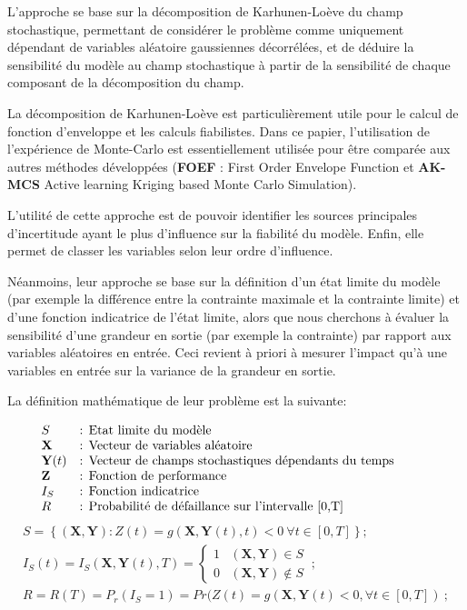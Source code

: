 \documentclass[a4paper,10pt]{article}
\begin{document}
L'approche se base sur la décomposition de Karhunen-Loève du champ stochastique, permettant de considérer le problème comme uniquement dépendant de variables aléatoire gaussiennes décorrélées, et de déduire la sensibilité du modèle au champ stochastique à partir de la sensibilité de chaque composant de la décomposition du champ. \smallskip 

La décomposition de Karhunen-Loève est particulièrement utile pour le calcul de fonction d'enveloppe et les calculs fiabilistes. Dans ce papier, l'utilisation de l’expérience de Monte-Carlo est essentiellement utilisée pour être comparée aux autres méthodes développées (\textbf{FOEF} : First Order Envelope Function et \textbf{AK-MCS} Active learning Kriging based Monte Carlo Simulation). \smallskip

L'utilité de cette approche est de pouvoir identifier les sources principales d'incertitude ayant le plus d'influence sur la fiabilité du modèle. Enfin, elle permet de classer les variables selon leur ordre d'influence. \smallskip

Néanmoins, leur approche se base sur la définition d'un état limite du modèle (par exemple la différence entre la contrainte maximale et la contrainte limite) et d'une fonction indicatrice de l'état limite, alors que nous cherchons à évaluer la sensibilité d'une grandeur en sortie (par exemple la contrainte) par rapport aux variables aléatoires en entrée. Ceci revient à priori à mesurer l'impact qu'à une variables en entrée sur la variance de la grandeur en sortie. \smallskip

La définition mathématique de leur problème est la suivante: 

   \[
      \begin{array}{lp{0.8\linewidth}}
         S             & : Etat limite du modèle \\
         \textbf{X}    & : Vecteur de variables aléatoire \\
         \textbf{Y}(t) & : Vecteur de champs stochastiques dépendants du temps \\
         \textbf{Z}    & : Fonction de performance \\
         I_S 	       & : Fonction indicatrice \\
         R  		   & : Probabilité de défaillance sur l'intervalle [0,T]
      \end{array}
   \]
   \begin{eqnarray}   
S = \left\lbrace \left( \textbf{X},\textbf{Y}\right) :Z(t)=g\left(\textbf{X},\textbf{Y}(t),t\right)<0\ \forall t \in\left[0,T \right] \right\rbrace ;\\
I_S(t) = I_S(\textbf{X},\textbf{Y}(t),T) = 
\begin{cases}
	1 &  (\textbf{X},\textbf{Y}) \in S \\ 
	0 &  (\textbf{X},\textbf{Y}) \not\in S
\end{cases}\ ;\\
R = R(T) = P_r(I_S=1) = Pr(Z(t) = g(\textbf{X},\textbf{Y}(t) < 0, \forall t \in \left[0,T\right]) \ ;
   \end{eqnarray}\\
\end{document}
